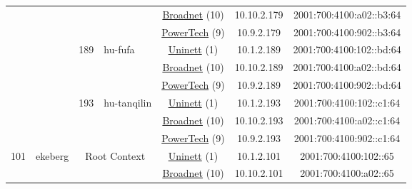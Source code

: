 \begin{small}
\begin{center}
\begin{longtable}{|c|c|c|c|c|c|c|c|}
  &  &  &  & \multicolumn{2}{|c|}{\tiny{\href{https://www.broadnet.no}{Broadnet} (10)}} & \tiny{10.10.2.179} & \tiny{2001:700:4100:a02::b3:64} \\* \cline{5-5}\cline{6-6}\cline{7-7}\cline{8-8}
  &  &  &  & \multicolumn{2}{|c|}{\tiny{\href{http://www.powertech.no}{PowerTech} (9)}} & \tiny{10.9.2.179} & \tiny{2001:700:4100:902::b3:64} \\* \cline{3-3}\cline{4-4}\cline{5-5}\cline{6-6}\cline{7-7}\cline{8-8}
  &  & \multirow{3}{*}{\tiny{189}} & \multicolumn{1}{|l|}{\multirow{3}{*}{\tiny{hu-fufa}}} & \multicolumn{2}{|c|}{\tiny{\href{https://www.uninett.no}{Uninett} (1)}} & \tiny{10.1.2.189} & \tiny{2001:700:4100:102::bd:64} \\* \cline{5-5}\cline{6-6}\cline{7-7}\cline{8-8}
  &  &  &  & \multicolumn{2}{|c|}{\tiny{\href{https://www.broadnet.no}{Broadnet} (10)}} & \tiny{10.10.2.189} & \tiny{2001:700:4100:a02::bd:64} \\* \cline{5-5}\cline{6-6}\cline{7-7}\cline{8-8}
  &  &  &  & \multicolumn{2}{|c|}{\tiny{\href{http://www.powertech.no}{PowerTech} (9)}} & \tiny{10.9.2.189} & \tiny{2001:700:4100:902::bd:64} \\* \cline{3-3}\cline{4-4}\cline{5-5}\cline{6-6}\cline{7-7}\cline{8-8}
  &  & \multirow{3}{*}{\tiny{193}} & \multicolumn{1}{|l|}{\multirow{3}{*}{\tiny{hu-tanqilin}}} & \multicolumn{2}{|c|}{\tiny{\href{https://www.uninett.no}{Uninett} (1)}} & \tiny{10.1.2.193} & \tiny{2001:700:4100:102::c1:64} \\* \cline{5-5}\cline{6-6}\cline{7-7}\cline{8-8}
  &  &  &  & \multicolumn{2}{|c|}{\tiny{\href{https://www.broadnet.no}{Broadnet} (10)}} & \tiny{10.10.2.193} & \tiny{2001:700:4100:a02::c1:64} \\* \cline{5-5}\cline{6-6}\cline{7-7}\cline{8-8}
  &  &  &  & \multicolumn{2}{|c|}{\tiny{\href{http://www.powertech.no}{PowerTech} (9)}} & \tiny{10.9.2.193} & \tiny{2001:700:4100:902::c1:64} \\ \hline
 \multirow{57}{*}{\tiny{101}} & \multicolumn{1}{|l|}{\multirow{57}{*}{\tiny{ekeberg}}} & \multicolumn{2}{|c|}{\multirow{3}{*}{\tiny{Root Context}}} & \multicolumn{2}{|c|}{\tiny{\href{https://www.uninett.no}{Uninett} (1)}} & \tiny{10.1.2.101} & \tiny{2001:700:4100:102::65} \\* \cline{5-5}\cline{6-6}\cline{7-7}\cline{8-8}
  &  & \multicolumn{2}{|c|}{} & \multicolumn{2}{|c|}{\tiny{\href{https://www.broadnet.no}{Broadnet} (10)}} & \tiny{10.10.2.101} & \tiny{2001:700:4100:a02::65} \\* \cline{5-5}\cline{6-6}\cline{7-7}\cline{8-8}

\end{longtable}
\end{center}
\end{small}

